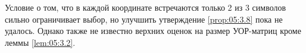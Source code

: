 Условие о том, что в каждой координате встречаются только 2 из 3 символов сильно ограничивает выбор, но улучшить утверждение \ref{prop:05:3.8} пока не удалось. Однако также не известно верхних оценок на размер УОР-матриц кроме леммы \ref{lem:05:3.2}. 





































